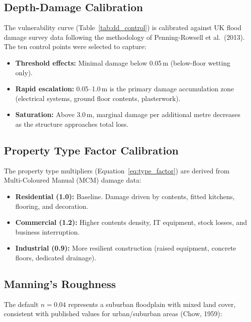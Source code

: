\documentclass[11pt,a4paper]{article}
\begin{document}
\subsection{Depth-Damage Calibration}

The vulnerability curve (Table~\ref{tab:dd_control}) is calibrated against UK flood
damage survey data following the methodology of Penning-Rowsell et al.\ (2013). The
ten control points were selected to capture:

\begin{itemize}[nosep]
    \item \textbf{Threshold effects:} Minimal damage below 0.05\,m (below-floor
          wetting only).
    \item \textbf{Rapid escalation:} 0.05--1.0\,m is the primary damage accumulation
          zone (electrical systems, ground floor contents, plasterwork).
    \item \textbf{Saturation:} Above 3.0\,m, marginal damage per additional metre
          decreases as the structure approaches total loss.
\end{itemize}

\subsection{Property Type Factor Calibration}

The property type multipliers (Equation~\ref{eq:type_factor}) are derived from
Multi-Coloured Manual (MCM) damage data:

\begin{itemize}[nosep]
    \item \textbf{Residential (1.0):} Baseline. Damage driven by contents, fitted
          kitchens, flooring, and decoration.
    \item \textbf{Commercial (1.2):} Higher contents density, IT equipment, stock
          losses, and business interruption.
    \item \textbf{Industrial (0.9):} More resilient construction (raised equipment,
          concrete floors, dedicated drainage).
\end{itemize}

\subsection{Manning's Roughness}

The default $n = 0.04$ represents a suburban floodplain with mixed land cover,
consistent with published values for urban/suburban areas (Chow, 1959):
\end{document}
